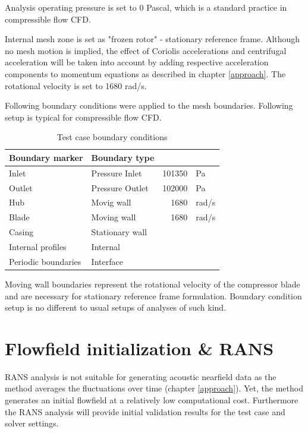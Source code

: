 Analysis operating pressure is set to 0 Pascal, which is a standard practice in compressible flow CFD.

Internal mesh zone is set as "frozen rotor" - stationary reference frame. Although no mesh motion is implied, the effect of Coriolis accelerations and centrifugal acceleration will be taken into account by adding respective acceleration components to momentum equations as described in chapter \ref{approach}. The rotational velocity is set to 1680 rad/s.

Following boundary conditions were applied to the mesh boundaries. Following setup is typical for compressible flow CFD.

\begin{table}[htb!]
\centering
\caption{Test case boundary conditions} \label{tab:testbcs}
\begin{tabular}{ | l | l | r l | } \hline
Boundary marker & Boundary type & & \\ \hline \hline
Inlet & Pressure Inlet & 101350  & Pa\\ \hline
Outlet & Pressure Outlet & 102000 & Pa \\ \hline
Hub & Movig wall & 1680 & rad/s \\ \hline
Blade & Moving wall & 1680 & rad/s \\ \hline
Casing & Stationary wall & &  \\ \hline
Internal profiles & Internal & & \\ \hline
Periodic boundaries & Interface & & \\ \hline 
\end{tabular}
\end{table}

Moving wall boundaries represent the rotational velocity of the compressor blade and are necessary for stationary reference frame formulation. Boundary condition setup is no different to usual setups of analyses of such kind.

\section{Flowfield initialization \& RANS}
RANS analysis is not suitable for generating acoustic nearfield data as the method averages the fluctuations over time (chapter \ref{approach}). Yet, the method generates an initial flowfield at a relatively low computational cost. Furthermore the RANS analysis will provide initial validation results for the test case and solver settings.


